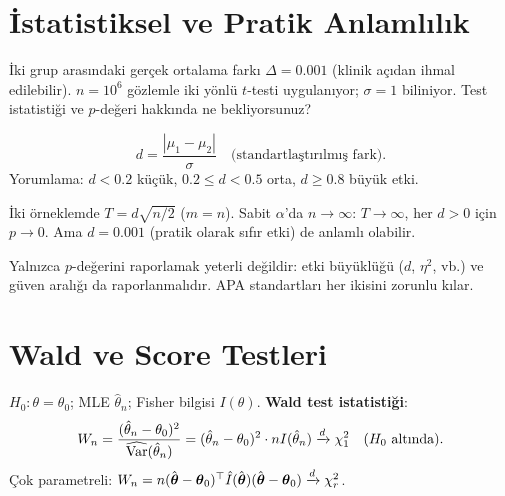 \section{İstatistiksel ve Pratik Anlamlılık}
\label{sec:etki_buyuklugu}

\begin{kesif}
İki grup arasındaki gerçek ortalama farkı $\Delta = 0.001$ (klinik açıdan ihmal
edilebilir). $n = 10^6$ gözlemle iki yönlü $t$-testi uygulanıyor; $\sigma = 1$
biliniyor. Test istatistiği ve $p$-değeri hakkında ne bekliyorsunuz?
\end{kesif}

\begin{tanim}\label{def:etki_buyuklugu}
\[
  d = \frac{|\mu_1-\mu_2|}{\sigma} \quad \text{(standartlaştırılmış fark)}.
\]
Yorumlama: $d<0.2$ küçük, $0.2\leq d<0.5$ orta, $d\geq0.8$ büyük etki.
\end{tanim}

\begin{teorem}\label{thm:t_d}
İki örneklemde $T=d\sqrt{n/2}$ ($m=n$). Sabit $\alpha$'da $n\to\infty$: $T\to\infty$, her $d>0$ için $p\to0$. Ama $d=0.001$ (pratik olarak sıfır etki) de anlamlı olabilir.
\end{teorem}

\begin{hataanalizi}
Yalnızca $p$-değerini raporlamak yeterli değildir: etki büyüklüğü ($d$, $\eta^2$, vb.) ve güven aralığı da raporlanmalıdır. APA standartları her ikisini zorunlu kılar.
\end{hataanalizi}

\section{Wald ve Score Testleri}
\label{sec:wald_score}

\begin{tanim}\label{def:wald_testi}
$H_0:\theta=\theta_0$; MLE $\hat\theta_n$; Fisher bilgisi $I(\theta)$. \textbf{Wald test istatistiği}:
\[
  W_n = \frac{(\hat\theta_n-\theta_0)^2}{\widehat{\operatorname{Var}}(\hat\theta_n)} = (\hat\theta_n-\theta_0)^2 \cdot nI(\hat\theta_n) \xrightarrow{d} \chi^2_1 \quad (H_0 \text{ altında}).
\]
Çok parametreli: $W_n = n(\hat{\boldsymbol\theta}-\boldsymbol\theta_0)^\top \hat{I}(\hat{\boldsymbol\theta})(\hat{\boldsymbol\theta}-\boldsymbol\theta_0)\xrightarrow{d}\chi^2_r$.
\end{tanim}

